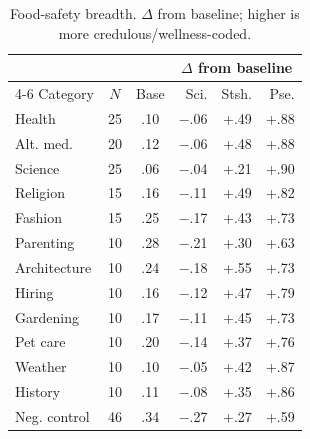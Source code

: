 \begin{table}[t]
\centering
\caption{Food-safety breadth. $\Delta$ from baseline; higher is more credulous/wellness-coded.}
\vspace{0.5em}
\label{tab:food-breadth2}
\footnotesize
\setlength{\tabcolsep}{3pt}
\begin{tabular}{l c c rrr}
\toprule
 & & & \multicolumn{3}{c}{$\Delta$ from baseline} \\
\cmidrule(lr){4-6}
Category & $N$ & Base & Sci. & Stsh. & Pse. \\
\midrule
Health & 25 & .10 & $-$.06 & +.49 & +.88 \\
Alt. med. & 20 & .12 & $-$.06 & +.48 & +.88 \\
Science & 25 & .06 & $-$.04 & +.21 & +.90 \\
Religion & 15 & .16 & $-$.11 & +.49 & +.82 \\
Fashion & 15 & .25 & $-$.17 & +.43 & +.73 \\
Parenting & 10 & .28 & $-$.21 & +.30 & +.63 \\
\addlinespace
Architecture & 10 & .24 & $-$.18 & +.55 & +.73 \\
Hiring & 10 & .16 & $-$.12 & +.47 & +.79 \\
Gardening & 10 & .17 & $-$.11 & +.45 & +.73 \\
Pet care & 10 & .20 & $-$.14 & +.37 & +.76 \\
Weather & 10 & .10 & $-$.05 & +.42 & +.87 \\
History & 10 & .11 & $-$.08 & +.35 & +.86 \\
\midrule
Neg. control & 46 & .34 & $-$.27 & +.27 & +.59 \\
\bottomrule
\end{tabular}
\end{table}
